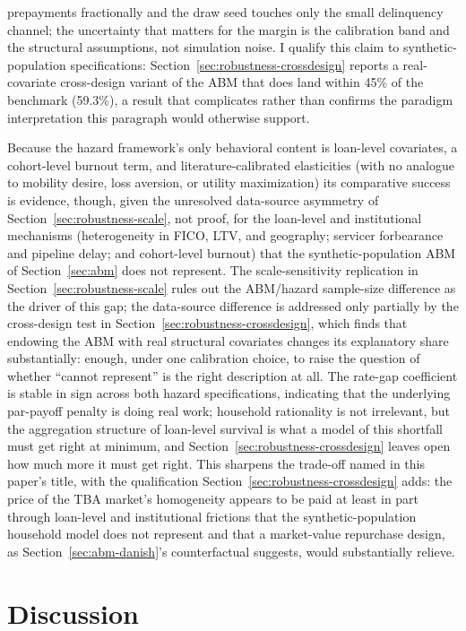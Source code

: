 \documentclass[12pt]{article}
\begin{document}
prepayments fractionally and the draw seed touches only the small delinquency channel; the uncertainty that matters for the margin is the calibration band and the structural assumptions, not simulation noise. I qualify this claim to synthetic-population specifications: Section~\ref{sec:robustness-crossdesign} reports a real-covariate cross-design variant of the ABM that does land within 45\% of the benchmark (59.3\%), a result that complicates rather than confirms the paradigm interpretation this paragraph would otherwise support.

Because the hazard framework's only behavioral content is loan-level covariates, a cohort-level burnout term, and literature-calibrated elasticities (with no analogue to mobility desire, loss aversion, or utility maximization) its comparative success is evidence, though, given the unresolved data-source asymmetry of Section~\ref{sec:robustness-scale}, not proof, for the loan-level and institutional mechanisms (heterogeneity in FICO, LTV, and geography; servicer forbearance and pipeline delay; and cohort-level burnout) that the synthetic-population ABM of Section~\ref{sec:abm} does not represent. The scale-sensitivity replication in Section~\ref{sec:robustness-scale} rules out the ABM/hazard sample-size difference as the driver of this gap; the data-source difference is addressed only partially by the cross-design test in Section~\ref{sec:robustness-crossdesign}, which finds that endowing the ABM with real structural covariates changes its explanatory share substantially: enough, under one calibration choice, to raise the question of whether ``cannot represent'' is the right description at all. The rate-gap coefficient is stable in sign across both hazard specifications, indicating that the underlying par-payoff penalty is doing real work; household rationality is not irrelevant, but the aggregation structure of loan-level survival is what a model of this shortfall must get right at minimum, and Section~\ref{sec:robustness-crossdesign} leaves open how much more it must get right. This sharpens the trade-off named in this paper's title, with the qualification Section~\ref{sec:robustness-crossdesign} adds: the price of the TBA market's homogeneity appears to be paid at least in part through loan-level and institutional frictions that the synthetic-population household model does not represent and that a market-value repurchase design, as Section~\ref{sec:abm-danish}'s counterfactual suggests, would substantially relieve.

\section{Discussion}\label{sec:discussion}
\end{document}
